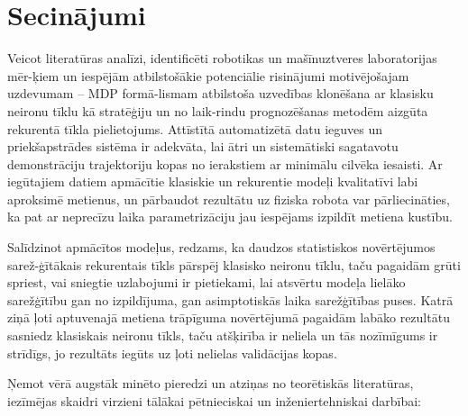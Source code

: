 \documentclass[12pt, a4paper]{article}
\numberwithin{equation}{section} %
\begin{document}
%
%
%
%
%
%
%
%
%
%
%
%
%
%
%
%
%
%
%


\newpage
{}
\section*{Secinājumi} %

Veicot literatūras analīzi, identificēti robotikas un mašīnuztveres laboratorijas mēr-ķiem un iespējām atbilstošākie potenciālie risinājumi motivējošajam uzdevumam -- MDP formā-lismam atbilstoša uzvedības klonēšana ar klasisku neironu tīklu kā stratēģiju un no laik-rindu prognozēšanas metodēm aizgūta rekurentā tīkla pielietojums. Attīstītā automatizētā datu ieguves un priekšapstrādes sistēma ir adekvāta, lai ātri un sistemātiski sagatavotu demonstrāciju trajektoriju kopas no ierakstiem ar minimālu cilvēka iesaisti. Ar iegūtajiem datiem apmācītie klasiskie un rekurentie modeļi kvalitatīvi labi aproksimē metienus, un pārbaudot rezultātu uz fiziska robota var pārliecināties, ka pat ar neprecīzu laika parametrizāciju jau iespējams izpildīt metiena kustību.

Salīdzinot apmācītos modeļus, redzams, ka daudzos statistiskos novērtējumos sarež-ģītākais rekurentais tīkls pārspēj klasisko neironu tīklu, taču pagaidām grūti spriest, vai sniegtie uzlabojumi ir pietiekami, lai atsvērtu modeļa lielāko sarežģītību gan no izpildījuma, gan asimptotiskās laika sarežģītības puses. Katrā ziņā ļoti aptuvenajā metiena trāpīguma novērtējumā pagaidām labāko rezultātu sasniedz klasiskais neironu tīkls, taču atšķirība ir neliela un tās nozīmīgums ir strīdīgs, jo rezultāts iegūts uz ļoti nelielas validācijas kopas.

Ņemot vērā augstāk minēto pieredzi un atziņas no teorētiskās literatūras, iezīmējas skaidri virzieni tālākai pētnieciskai un inženiertehniskai darbībai:
\end{document}
